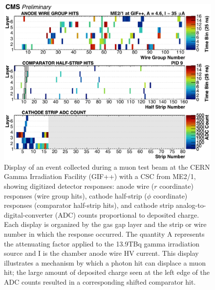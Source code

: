
\begin{figure}[htbp]
	\centering
	\includegraphics[width=\dummyFigWidth]{figures/neutron/ED_GIF_3384_ME21_9.pdf}
	\caption{Display of an event collected during a muon test beam at the CERN Gamma Irradiation Facility (GIF++) with a CSC from ME2/1, showing digitized detector responses: anode wire ($r$ coordinate) responses (wire group hits), cathode half-strip ($\phi$ coordinate) responses (comparator half-strip hits), and cathode strip analog-to-digital-converter (ADC) counts proportional to deposited charge. Each display is organized by the gas gap layer and the strip or wire number in which the response occurred. The quantity A represents the attenuating factor applied to the 13.9\unit{TBq}  gamma irradiation source and I is the chamber anode wire HV current. This display illustrates a mechanism by which a photon hit can displace a muon hit; the large amount of deposited charge seen at the left edge of the ADC counts resulted in a corresponding shifted comparator hit.}
	\label{fig:ed}
\end{figure}

